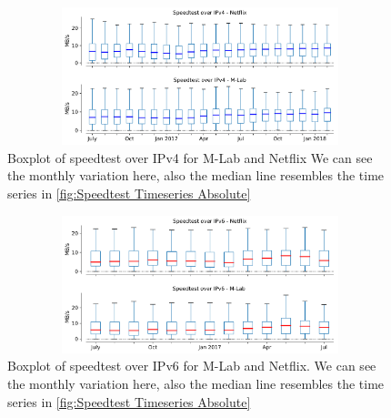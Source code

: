 \begin{figure}[!ht]
	\centering
	\includegraphics[keepaspectratio, height=4cm, width=15cm]{figures/mlab/netflix-throughput-boxplot-speedtest-separate-v4.pdf}
	\caption[Speedtest Boxplot Absolute IPv4]{Boxplot of speedtest over IPv4 for M-Lab and Netflix We can see the monthly variation here, also the median line resembles the time series in \cref{fig:Speedtest Timeseries Absolute}}
	\label{fig:Speedtest Boxplot Absolute IPv4}
\end{figure}

\begin{figure}[!ht]
	\centering
	\includegraphics[keepaspectratio, height=4cm, width=15cm]{figures/mlab/netflix-throughput-boxplot-speedtest-separate-v6.pdf}
	\caption[Speedtest Boxplot Absolute IPv6]{Boxplot of speedtest over IPv6 for M-Lab and Netflix. We can see the monthly variation here, also the median line resembles the time series in \cref{fig:Speedtest Timeseries Absolute}}
	\label{fig:Speedtest Boxplot Absolute IPv6}
\end{figure}

